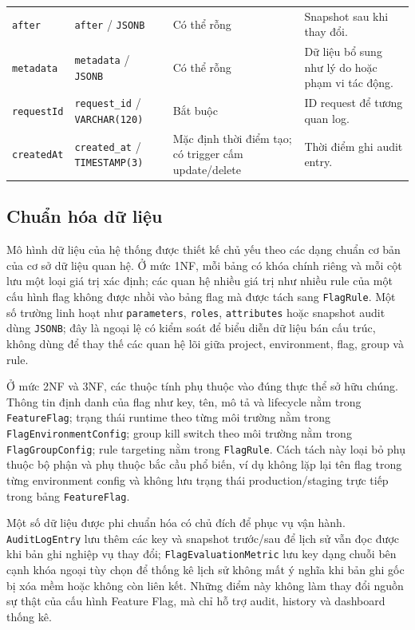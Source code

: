 \begin{table}[H]
\begin{tabular}{p{} p{} p{} p{}}
        \texttt{after} & \texttt{after} / \texttt{JSONB} & Có thể rỗng & Snapshot sau khi thay đổi. \\
        \texttt{metadata} & \texttt{metadata} / \texttt{JSONB} & Có thể rỗng & Dữ liệu bổ sung như lý do hoặc phạm vi tác động. \\
        \texttt{requestId} & \texttt{request\_id} / \texttt{VARCHAR(120)} & Bắt buộc & ID request để tương quan log. \\
        \texttt{createdAt} & \texttt{created\_at} / \texttt{TIMESTAMP(3)} & Mặc định thời điểm tạo; có trigger cấm update/delete & Thời điểm ghi audit entry. \\
        \bottomrule
    \end{tabular}
    \endgroup
\end{table}

\subsection{Chuẩn hóa dữ liệu}

Mô hình dữ liệu của hệ thống được thiết kế chủ yếu theo các dạng chuẩn cơ bản của cơ sở dữ liệu quan hệ. Ở mức 1NF, mỗi bảng có khóa chính riêng và mỗi cột lưu một loại giá trị xác định; các quan hệ nhiều giá trị như nhiều rule của một cấu hình flag không được nhồi vào bảng flag mà được tách sang \texttt{FlagRule}. Một số trường linh hoạt như \texttt{parameters}, \texttt{roles}, \texttt{attributes} hoặc snapshot audit dùng \texttt{JSONB}; đây là ngoại lệ có kiểm soát để biểu diễn dữ liệu bán cấu trúc, không dùng để thay thế các quan hệ lõi giữa project, environment, flag, group và rule.

Ở mức 2NF và 3NF, các thuộc tính phụ thuộc vào đúng thực thể sở hữu chúng. Thông tin định danh của flag như key, tên, mô tả và lifecycle nằm trong \texttt{FeatureFlag}; trạng thái runtime theo từng môi trường nằm trong \texttt{FlagEnvironmentConfig}; group kill switch theo môi trường nằm trong \texttt{FlagGroupConfig}; rule targeting nằm trong \texttt{FlagRule}. Cách tách này loại bỏ phụ thuộc bộ phận và phụ thuộc bắc cầu phổ biến, ví dụ không lặp lại tên flag trong từng environment config và không lưu trạng thái production/staging trực tiếp trong bảng \texttt{FeatureFlag}.

Một số dữ liệu được phi chuẩn hóa có chủ đích để phục vụ vận hành. \texttt{AuditLogEntry} lưu thêm các key và snapshot trước/sau để lịch sử vẫn đọc được khi bản ghi nghiệp vụ thay đổi; \texttt{FlagEvaluationMetric} lưu key dạng chuỗi bên cạnh khóa ngoại tùy chọn để thống kê lịch sử không mất ý nghĩa khi bản ghi gốc bị xóa mềm hoặc không còn liên kết. Những điểm này không làm thay đổi nguồn sự thật của cấu hình Feature Flag, mà chỉ hỗ trợ audit, history và dashboard thống kê.

